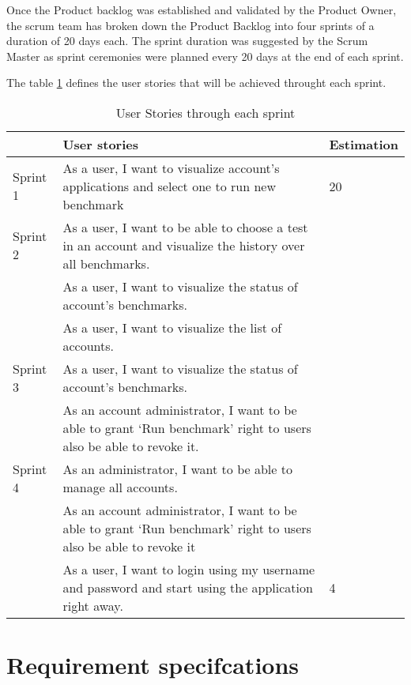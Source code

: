 Once the Product backlog was established and validated by the Product Owner, the
scrum team has broken down the Product Backlog into four sprints of a duration
of 20 days each. The sprint duration was suggested by the Scrum Master as sprint
ceremonies were planned every 20 days at the end of each sprint.

The table \hyperref[sprints]{\ref{sprints}} defines the user stories that will
be achieved throught each sprint.

\begin{table}[]
\centering
\label{sprints}
\begin{tabular}{|p{2cm}|p{7cm}|p{2cm}|}
                          &  User stories & Estimation \\ \hline
Sprint 1                 &  As a user, I want to visualize account’s applications and select one to run new benchmark &  20\\ \hline
{\multirow{3}{*}{}} Sprint 2 &  As a user, I want to be able to choose a test in an account and visualize the history over all benchmarks.&  \\ \cline{2-3} 
{}                  &  As a user, I want to visualize the status of account’s benchmarks. &  \\ \cline{2-3} 
{}                  & As a user, I want to visualize the list of accounts. &  \\ \hline
{\multirow{2}{*}{}} Sprint 3 & As a user, I want to visualize the status of account’s benchmarks. &  \\ \cline{2-3} 
{}                  &  As an account administrator, I want to be able to grant ‘Run benchmark’  right to users also be able to revoke it.&  \\ \hline
{\multirow{3}{*}{}} Sprint 4 &  As an administrator, I want to be able to manage all accounts. &  \\ \cline{2-3} 
{}                  &  As an account administrator, I want to be able to grant ‘Run benchmark’  right to users also be able to revoke it&  \\ \cline{2-3} 
{}                  & As a user, I want to login using my username and password and start using the application right away. & 4  \\ \hline
\end{tabular}
\caption{User Stories through each sprint}
\end{table}
\section{Requirement specifcations}
